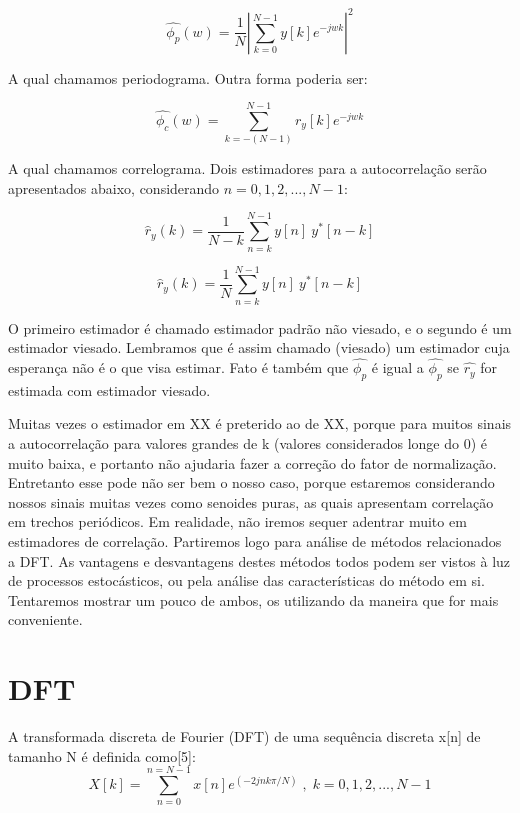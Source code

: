 \documentclass[a4paper, 12pt]{book}
\begin{document}
\begin{equation}
\hat{\phi_p}(w)=\frac{1}{N}  \left|\sum_{k=0}^{N-1}y[k]e^{-jwk}  \right|^2
\end{equation}

A qual chamamos periodograma. Outra forma poderia ser:

\begin{equation}
\hat{\phi_c}(w)=\sum_{k=-(N-1)}^{N-1}r_y[k]e^{-jwk}
\end{equation}

A qual chamamos correlograma. Dois estimadores para a autocorrelação serão apresentados abaixo, considerando $n=0,1,2,..., N-1$:

\begin{equation}
\hat{r}_y(k)=\frac{1}{N-k}\sum_{n=k}^{N-1}y[n] \: y^*[n-k]
\end{equation}

\begin{equation}
\hat{r}_y(k)=\frac{1}{N}\sum_{n=k}^{N-1}y[n] \: y^*[n-k]
\end{equation}

O primeiro estimador é chamado estimador padrão não viesado, e o segundo é um estimador viesado. Lembramos que é assim chamado (viesado) um estimador cuja esperança não é o que visa estimar. Fato é também que $\hat{\phi_p}$ é igual a $\hat{\phi_p}$ se $\hat{r_y}$ for estimada com estimador viesado.

\indent Muitas vezes o estimador em XX é preterido ao de XX, porque para muitos sinais a autocorrelação para valores grandes de k (valores considerados longe do 0) é muito baixa, e portanto não ajudaria fazer a correção do fator de normalização. Entretanto esse pode não ser bem o nosso caso, porque estaremos considerando nossos sinais muitas vezes como senoides puras, as quais apresentam correlação em trechos periódicos. Em realidade, não iremos sequer adentrar muito em estimadores de correlação. Partiremos logo para análise de métodos relacionados a DFT. As vantagens e desvantagens destes métodos todos podem ser vistos à luz de processos estocásticos, ou pela análise das características do método em si. Tentaremos mostrar um pouco de ambos, os utilizando da maneira que for mais conveniente. 
\section{DFT}
A transformada discreta de Fourier (DFT) de uma sequência discreta {x[n]} de tamanho N é definida como[5]:
\begin{equation}
X[k]=\sum_{n=0}^{n=N-1} x[n]e^{(-2jnk\pi/N)}\;,\;k=0,1,2,...,N-1
\end{equation}
\end{document}
